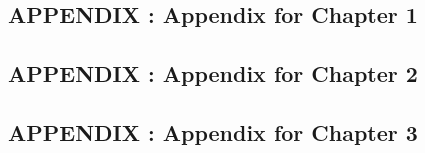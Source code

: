 \documentclass[12pt,letterpaper]{uncdissertation}
\begin{document}
\begin{doublespace}
\begin{singlespace}
\chapter*{APPENDIX \thechapter: Appendix for Chapter 1}
\end{singlespace}


\begin{singlespace}
\chapter*{APPENDIX \thechapter: Appendix for Chapter 2}
\end{singlespace}


\begin{singlespace}
\chapter*{APPENDIX \thechapter: Appendix for Chapter 3}
\end{singlespace}



\clearpage
{}
\begin{singlespace}


\end{singlespace}



\end{doublespace}
\end{document}

